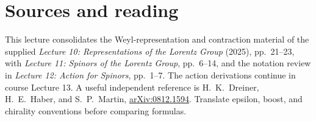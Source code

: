 \documentclass[11pt]{article}
\begin{document}
\section*{Sources and reading}
This lecture consolidates the Weyl-representation and contraction
material of the supplied \emph{Lecture 10: Representations of the Lorentz
Group} (2025), pp.\ 21--23, with \emph{Lecture 11: Spinors of the Lorentz
Group}, pp.\ 6--14, and the notation review in \emph{Lecture 12:
Action for Spinors}, pp.\ 1--7. The action derivations continue in
course Lecture 13. A useful independent reference is H.~K.~Dreiner,
H.~E.~Haber, and S.~P.~Martin,
\href{https://arxiv.org/abs/0812.1594}{arXiv:0812.1594}.
Translate epsilon, boost, and chirality conventions before comparing formulas.
\end{document}
